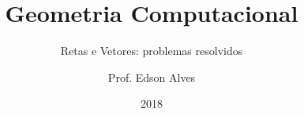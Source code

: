 \title{Geometria Computacional}
\subtitle{Retas e Vetores: problemas resolvidos}
\date{2018}
\author{Prof. Edson Alves}
